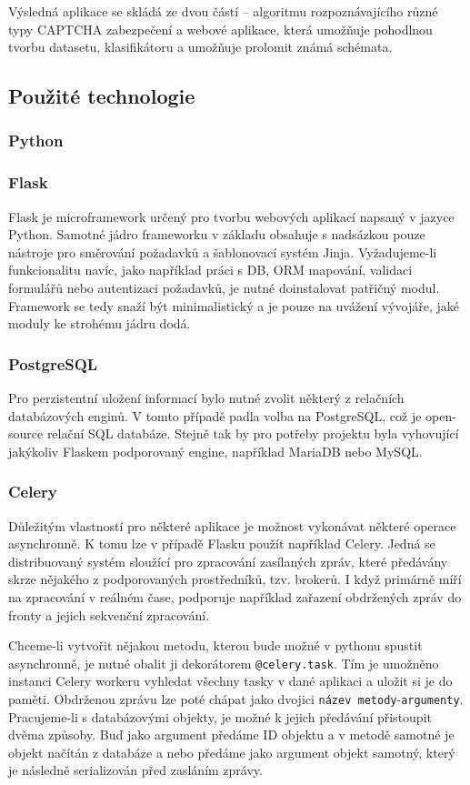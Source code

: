 \documentclass[
  master=true,
  biblatex,
  glossaries,
  index
]{kidiplom}
\begin{document}
Výsledná aplikace se skládá ze dvou částí -- algoritmu rozpoznávajícího různé typy CAPTCHA zabezpečení a webové aplikace, která umožňuje pohodlnou tvorbu datasetu, klasifikátoru a umožňuje prolomit známá schémata.


\subsection{Použité technologie}
\subsubsection*{Python}

\subsubsection*{Flask}
Flask je microframework určený pro tvorbu webových aplikací napsaný v jazyce Python. Samotné jádro frameworku v základu obsahuje s nadsázkou pouze nástroje pro směrování požadavků a šablonovací systém Jinja. Vyžadujeme-li funkcionalitu navíc, jako například práci s DB, ORM mapování, validaci formulářů nebo autentizaci požadavků, je nutné doinstalovat patřičný modul. Framework se tedy snaží být minimalistický a je pouze na uvážení vývojáře, jaké moduly ke strohému jádru dodá. 
\subsubsection*{PostgreSQL}
Pro perzistentní uložení informací bylo nutné zvolit některý z relačních databázových enginů. V tomto případě padla volba na PostgreSQL, což je open-source relační SQL databáze. Stejně tak by pro potřeby projektu byla vyhovující jakýkoliv Flaskem podporovaný engine, například MariaDB nebo MySQL.
\subsubsection*{Celery}
Důležitým vlastností pro některé aplikace je možnost vykonávat některé operace asynchronně. K tomu lze v případě Flasku použít například Celery. Jedná se distribuovaný systém sloužící pro zpracování zasílaných zpráv, které předávány skrze nějakého z podporovaných prostředníků, tzv. brokerů. I když primárně míří na zpracování v reálném čase, podporuje například zařazení obdržených zpráv do fronty a jejich sekvenční zpracování.

Chceme-li vytvořit nějakou metodu, kterou bude možné v pythonu spustit asynchronně, je nutné obalit ji dekorátorem \texttt{@celery.task}. Tím je umožněno instanci Celery workeru vyhledat všechny tasky v dané aplikaci a uložit si je do paměti. Obdrženou zprávu lze poté chápat jako dvojici \texttt{název metody}-\texttt{argumenty}. Pracujeme-li s databázovými objekty, je možné k jejich předávání přistoupit dvěma způsoby. Buď jako argument předáme ID objektu a v metodě samotné je objekt načítán z databáze a nebo předáme jako argument objekt samotný, který je následně serializován před zasláním zprávy.
\end{document}
